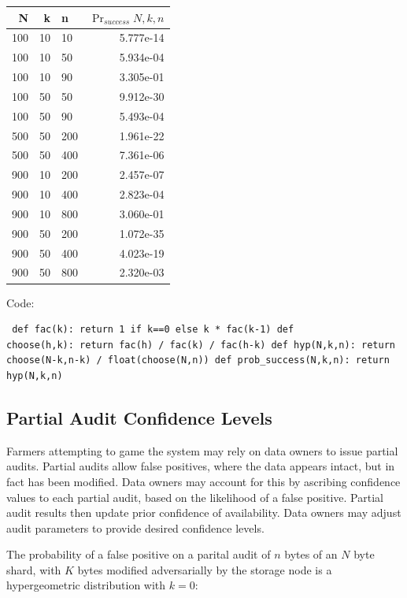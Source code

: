 \documentclass[a4paper,10pt]{article} \usepackage[utf8]{inputenc}
\begin{document}
\begin{table}[hbt!] \begin{center} \begin{tabular}{r r l r} N & k & n &
$\Pr_{success}{N,k,n}$\\ \hline 100 & 10 & 10  & 5.777e-14\\ \hline 100 & 10 &
50  & 5.934e-04\\ \hline 100 & 10 & 90  & 3.305e-01\\ \hline 100 & 50 & 50  &
9.912e-30\\ \hline 100 & 50 & 90  & 5.493e-04\\ \hline 500 & 50 & 200 &
1.961e-22\\ \hline 500 & 50 & 400 & 7.361e-06\\ \hline 900 & 10 & 200 &
2.457e-07\\ \hline 900 & 10 & 400 & 2.823e-04\\ \hline 900 & 10 & 800 &
3.060e-01\\ \hline 900 & 50 & 200 & 1.072e-35\\ \hline 900 & 50 & 400 &
4.023e-19\\ \hline 900 & 50 & 800 & 2.320e-03\\ \end{tabular} \end{center}
\end{table}

Code: \begin{lstlisting} def fac(k): return 1 if k==0 else k * fac(k-1) def
choose(h,k): return fac(h) / fac(k) / fac(h-k) def hyp(N,k,n): return
choose(N-k,n-k) / float(choose(N,n)) def prob_success(N,k,n): return hyp(N,k,n)
\end{lstlisting}

\subsection{Partial Audit Confidence Levels}

Farmers attempting to game the system may rely on data owners to issue partial
audits. Partial audits allow false positives, where the data appears intact, but
in fact has been modified. Data owners may account for this by ascribing
confidence values to each partial audit, based on the likelihood of a false
positive. Partial audit results then update prior confidence of availability.
Data owners may adjust audit parameters to provide desired confidence levels.

The probability of a false positive on a parital audit of $ n $ bytes of an $ N
$ byte shard, with $ K $ bytes modified adversarially by the storage node is a
hypergeometric distribution with $ k = 0 $:
\end{document}
